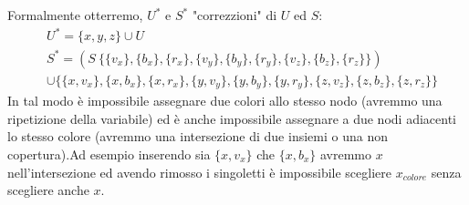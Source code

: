\documentclass[a4paper]{article}
\begin{document}
Formalmente otterremo, $U^*$ e $S^*$ "correzzioni" di $U$ ed $S$:
\begin{align*}
&	U^* = \{x, y, z\} \cup U \\
& 	S^* = (S \ \{\{v_x\}, \{b_x\}, \{r_x\}, \{v_y\}, \{b_y\}, \{r_y\}, \{v_z\}, \{b_z\}, \{r_z\}\}) \\
&	\cup \{\{x, v_x\}, \{x, b_x\}, \{x, r_x\}, \{y, v_y\}, \{y, b_y\}, \{y, r_y\}, \{z, v_z\}, \{z, b_z\}, \{z, r_z\}\}
\end{align*}
In tal modo è impossibile assegnare due colori allo stesso nodo (avremmo una ripetizione della variabile) ed è anche impossibile assegnare a due nodi adiacenti lo stesso colore (avremmo una intersezione di due insiemi o una non copertura).Ad esempio inserendo sia $\{x,v_x\}$ che $\{x,b_x\}$ avremmo $x$ nell'intersezione ed avendo rimosso i singoletti è impossibile scegliere $x_{colore}$ senza scegliere anche $x$.
\end{document}
